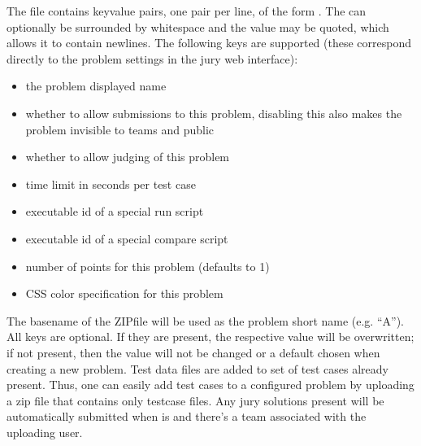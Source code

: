 \documentclass[a4paper,10pt,english,openany]{sphinxmanual}
\begin{document}
\sphinxAtStartPar
The file  contains key\sphinxhyphen{}value pairs, one
pair per line, of the form . The \sphinxcode{\sphinxupquote{=}} can
optionally be surrounded by whitespace and the value may be quoted,
which allows it to contain newlines. The following keys are supported
(these correspond directly to the problem settings in the jury web
interface):
\begin{itemize}
\item {} 
\sphinxAtStartPar
{} \sphinxhyphen{} the problem displayed name

\item {} 
\sphinxAtStartPar
{} \sphinxhyphen{} whether to allow submissions to this problem,
disabling this also makes the problem invisible to teams and public

\item {} 
\sphinxAtStartPar
{} \sphinxhyphen{} whether to allow judging of this problem

\item {} 
\sphinxAtStartPar
{} \sphinxhyphen{} time limit in seconds per test case

\item {} 
\sphinxAtStartPar
{} \sphinxhyphen{} executable id of a special run script

\item {} 
\sphinxAtStartPar
{} \sphinxhyphen{} executable id of a special compare script

\item {} 
\sphinxAtStartPar
{} \sphinxhyphen{} number of points for this problem (defaults to 1)

\item {} 
\sphinxAtStartPar
{} \sphinxhyphen{} CSS color specification for this problem

\end{itemize}

\sphinxAtStartPar
The basename of the ZIP\sphinxhyphen{}file will be used as the problem short name (e.g. “A”).
All keys are optional. If they are present, the respective value will be
overwritten; if not present, then the value will not be changed or a default
chosen when creating a new problem. Test data files are added to set of test
cases already present. Thus, one can easily add test cases to a configured
problem by uploading a zip file that contains only testcase files. Any jury
solutions present will be automatically submitted when  is
 and there’s a team associated with the uploading user.
\end{document}
